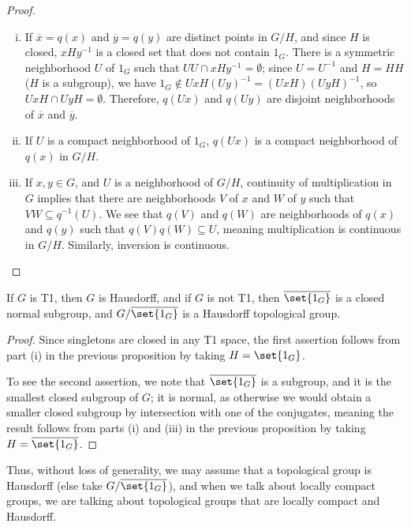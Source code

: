 \documentclass[10pt]{mypackage}
\begin{document}
\begin{proof}\hfill
  \begin{enumerate}[(i)]
    \item If $ \overline{x} = q(x) $ and $ \overline{y} = q(y) $ are distinct points in $G/H$, and since $H$ is closed, $xHy^{-1}$ is a closed set that does not contain $1_G$. There is a symmetric neighborhood $U$ of $1_G$ such that $UU \cap xHy^{-1} = \emptyset$; since $U = U^{-1}$ and $H = HH$ ($H$ is a subgroup), we have $1_G\notin UxH\left( Uy \right)^{-1} = \left( UxH \right)\left( UyH \right)^{-1}$, so $UxH\cap UyH = \emptyset$. Therefore, $q\left( Ux \right)$ and $q\left( Uy \right)$ are disjoint neighborhoods of $ \overline{x} $ and $ \overline{y} $.
    \item If $U$ is a compact neighborhood of $1_G$, $q\left( Ux \right)$ is a compact neighborhood of $q(x)$ in $G/H$.
    \item If $x,y\in G$, and $U$ is a neighborhood of $G/H$, continuity of multiplication in $G$ implies that there are neighborhoods $V$ of $x$ and $W$ of $y$ such that $VW\subseteq q^{-1}(U)$. We see that $q(V)$ and $q(W)$ are neighborhoods of $q(x)$ and $q(y)$ such that $q(V)q(W)\subseteq U$, meaning multiplication is continuous in $G/H$. Similarly, inversion is continuous.
  \end{enumerate}
\end{proof}
\begin{corollary}
  If $G$ is T1, then $G$ is Hausdorff, and if $G$ is not T1, then $ \overline{\set{1_G}} $ is a closed normal subgroup, and $G/ \overline{\set{1_G}}$ is a Hausdorff topological group.
\end{corollary}
\begin{proof}
  Since singletons are closed in any T1 space, the first assertion follows from part (i) in the previous proposition by taking $H = \set{1_G}$.\newline

  To see the second assertion, we note that $ \overline{\set{1_G}} $ is a subgroup, and it is the smallest closed subgroup of $G$; it is normal, as otherwise we would obtain a smaller closed subgroup by intersection with one of the conjugates, meaning the result follows from parts (i) and (iii) in the previous proposition by taking $H = \overline{\set{1_G}}$.
\end{proof}
Thus, without loss of generality, we may assume that a topological group is Hausdorff (else take $G/ \overline{\set{1_G}}$), and when we talk about locally compact groups, we are talking about topological groups that are locally compact and Hausdorff.
\end{document}
